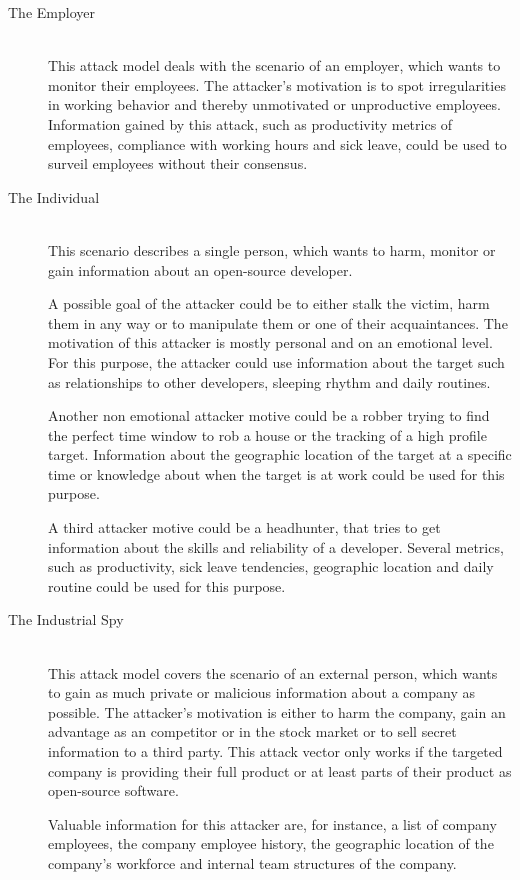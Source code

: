 \begin{description}
    \item[The Employer] \hfill \\
        This attack model deals with the scenario of an employer, which wants to monitor their employees.
        The attacker's motivation is to spot irregularities in working behavior and thereby unmotivated or unproductive employees.
        Information gained by this attack, such as productivity metrics of employees, compliance with working hours and sick leave, could be used to surveil employees without their consensus.

    \item[The Individual] \hfill \\
        This scenario describes a single person, which wants to harm, monitor or gain information about an open-source developer.

        A possible goal of the attacker could be to either stalk the victim, harm them in any way or to manipulate them or one of their acquaintances.
        The motivation of this attacker is mostly personal and on an emotional level.
        For this purpose, the attacker could use information about the target such as relationships to other developers, sleeping rhythm and daily routines.

        Another non emotional attacker motive could be a robber trying to find the perfect time window to rob a house or the tracking of a high profile target.
        Information about the geographic location of the target at a specific time or knowledge about when the target is at work could be used for this purpose.

        A third attacker motive could be a headhunter, that tries to get information about the skills and reliability of a developer.
        Several metrics, such as productivity, sick leave tendencies, geographic location and daily routine could be used for this purpose.

    \item[The Industrial Spy] \hfill \\
        This attack model covers the scenario of an external person, which wants to gain as much private or malicious information about a company as possible.
        The attacker's motivation is either to harm the company, gain an advantage as an competitor or in the stock market or to sell secret information to a third party.
        This attack vector only works if the targeted company is providing their full product or at least parts of their product as open-source software.

        Valuable information for this attacker are, for instance, a list of company employees, the company employee history, the geographic location of the company's workforce and internal team structures of the company.
\end{description}


